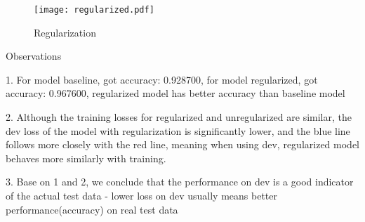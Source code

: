 \begin{answer}
\begin{figure}[H]
    \centering
    \texttt{[image: regularized.pdf]}
    \caption{Regularization}
    \label{fig:enter-label}
\end{figure}

Observations

1. For model baseline, got accuracy: 0.928700, for model regularized, got accuracy: 0.967600, regularized model has better accuracy than baseline model

2. Although the training losses for regularized and unregularized are similar, the dev loss of the model with regularization is significantly lower, and the blue line follows more closely with the red line, meaning when using dev, regularized model behaves more similarly with training.

3. Base on 1 and 2, we conclude that the performance on dev is a good indicator of the actual test data - lower loss on dev usually means better performance(accuracy) on real test data
\end{answer}
   
  
